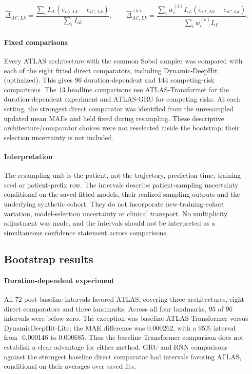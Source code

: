 \[
\widehat\Delta_{AC,Lk}=\frac{\sum_i I_{iL}(e_{iA,Lk}-e_{iC,Lk})}{\sum_i I_{iL}},\qquad
\widehat\Delta^{(b)}_{AC,Lk}=\frac{\sum_i w_i^{(b)}I_{iL}(e_{iA,Lk}-e_{iC,Lk})}{\sum_i w_i^{(b)}I_{iL}}.
\]
\paragraph{Fixed comparisons} Every ATLAS architecture with the common Sobol sampler was compared with each of the eight fitted direct comparators, including Dynamic-DeepHit (optimized). This gives 96 duration-dependent and 144 competing-risk comparisons. The 13 headline comparisons use ATLAS-Transformer for the duration-dependent experiment and ATLAS-GRU for competing risks. At each setting, the strongest direct comparator was identified from the unresampled updated mean MAEs and held fixed during resampling. These descriptive architecture/comparator choices were not reselected inside the bootstrap; their selection uncertainty is not included.

\paragraph{Interpretation} The resampling unit is the patient, not the trajectory, prediction time, training seed or patient-prefix row. The intervals describe patient-sampling uncertainty conditional on the saved fitted models, their realized sampling outputs and the underlying synthetic cohort. They do not incorporate new-training-cohort variation, model-selection uncertainty or clinical transport. No multiplicity adjustment was made, and the intervals should not be interpreted as a simultaneous confidence statement across comparisons.

\subsection{Bootstrap results}
\paragraph{Duration-dependent experiment} All 72 post-baseline intervals favored ATLAS, covering three architectures, eight direct comparators and three landmarks. Across all four landmarks, 95 of 96 intervals were below zero. The exception was baseline ATLAS-Transformer versus DynamicDeepHit-Lite: the MAE difference was 0.000262, with a 95\% interval from -0.000146 to 0.000685. Thus the baseline Transformer comparison does not establish a clear advantage for either method. GRU and RNN comparisons against the strongest baseline direct comparator had intervals favoring ATLAS, conditional on their averages over saved fits.

